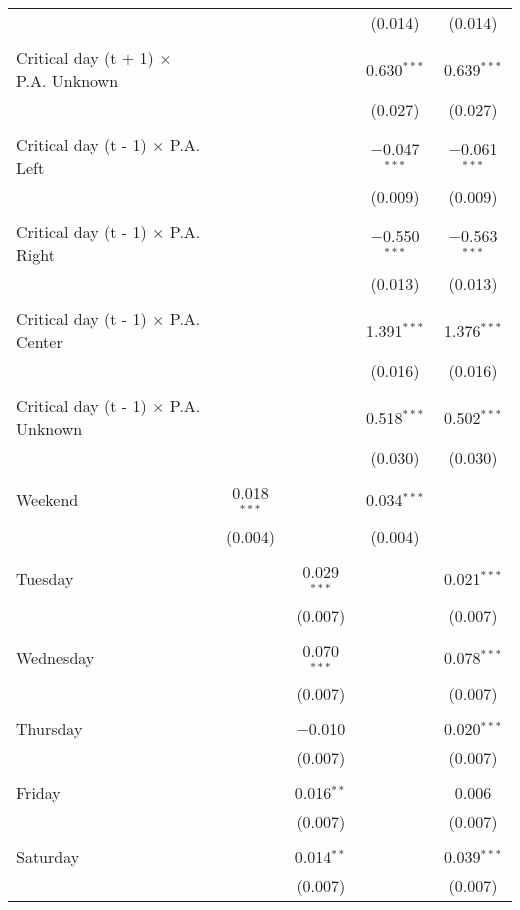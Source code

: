 \documentclass[
]{article}
\begin{document}
\begin{table}[!htbp]
{\begin{tabular}{@{\extracolsep{5pt}}lcccc}
  &  &  & (0.014) & (0.014) \\ 
  & & & & \\ 
 Critical day (t + 1) $\times$ P.A. Unknown &  &  & 0.630$^{***}$ & 0.639$^{***}$ \\ 
  &  &  & (0.027) & (0.027) \\ 
  & & & & \\ 
 Critical day (t - 1) $\times$ P.A. Left &  &  & $-$0.047$^{***}$ & $-$0.061$^{***}$ \\ 
  &  &  & (0.009) & (0.009) \\ 
  & & & & \\ 
 Critical day (t - 1) $\times$ P.A. Right &  &  & $-$0.550$^{***}$ & $-$0.563$^{***}$ \\ 
  &  &  & (0.013) & (0.013) \\ 
  & & & & \\ 
 Critical day (t - 1) $\times$ P.A. Center &  &  & 1.391$^{***}$ & 1.376$^{***}$ \\ 
  &  &  & (0.016) & (0.016) \\ 
  & & & & \\ 
 Critical day (t - 1) $\times$ P.A. Unknown &  &  & 0.518$^{***}$ & 0.502$^{***}$ \\ 
  &  &  & (0.030) & (0.030) \\ 
  & & & & \\ 
 Weekend & 0.018$^{***}$ &  & 0.034$^{***}$ &  \\ 
  & (0.004) &  & (0.004) &  \\ 
  & & & & \\ 
 Tuesday &  & 0.029$^{***}$ &  & 0.021$^{***}$ \\ 
  &  & (0.007) &  & (0.007) \\ 
  & & & & \\ 
 Wednesday &  & 0.070$^{***}$ &  & 0.078$^{***}$ \\ 
  &  & (0.007) &  & (0.007) \\ 
  & & & & \\ 
 Thursday &  & $-$0.010 &  & 0.020$^{***}$ \\ 
  &  & (0.007) &  & (0.007) \\ 
  & & & & \\ 
 Friday &  & 0.016$^{**}$ &  & 0.006 \\ 
  &  & (0.007) &  & (0.007) \\ 
  & & & & \\ 
 Saturday &  & 0.014$^{**}$ &  & 0.039$^{***}$ \\ 
  &  & (0.007) &  & (0.007) \\ 

\end{tabular}}
\end{table}
\end{document}
